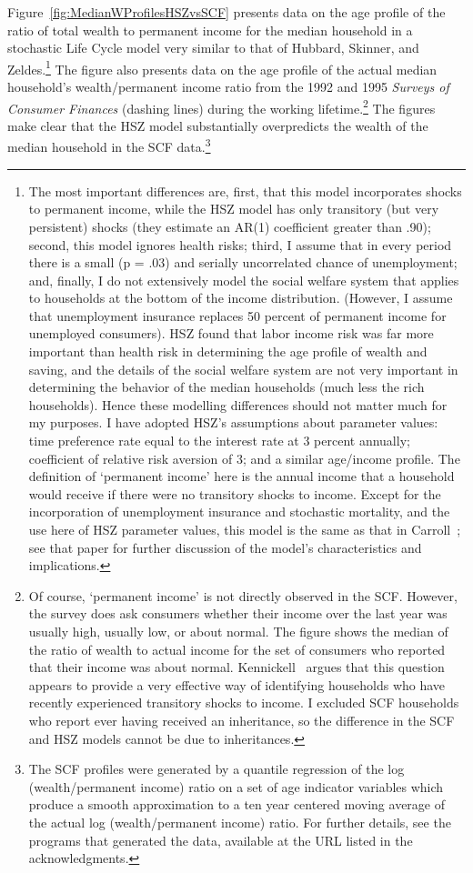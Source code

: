 \documentclass[titlepage,12pt]{article}
\begin{document}
Figure~\ref{fig:MedianWProfilesHSZvsSCF} presents data on the age 
profile of the ratio of total wealth to permanent income for the 
median household in a stochastic Life Cycle model very similar to that 
of Hubbard, Skinner, and Zeldes.\footnote{The most important 
differences are, first, that this model incorporates shocks to 
permanent income, while the HSZ model has only transitory (but very 
persistent) shocks (they estimate an AR(1) coefficient greater than 
.90); second, this model ignores health risks; third, I assume that in 
every period there is a small (p = .03) and serially uncorrelated 
chance of unemployment; and, finally, I do not extensively model the 
social welfare system that applies to households at the bottom of the 
income distribution.  (However, I assume that unemployment insurance 
replaces 50 percent of permanent income for unemployed consumers).  
HSZ found that labor income risk was far more important than health 
risk in determining the age profile of wealth and saving, and the 
details of the social welfare system are not very important in 
determining the behavior of the median households (much less the rich 
households).  Hence these modelling differences should not matter much 
for my purposes.  I have adopted HSZ's assumptions about parameter 
values: time preference rate equal to the interest rate at 3 percent 
annually; coefficient of relative risk aversion of 3; and a similar 
age/income profile.  The definition of `permanent income' here is the 
annual income that a household would receive if there were no 
transitory shocks to income.  Except for the incorporation of 
unemployment insurance and stochastic mortality, and the use here of 
HSZ parameter values, this model is the same as that in 
Carroll~\cite{carrollBSLCPIH}; see that paper for further discussion 
of the model's characteristics and implications.} The figure also 
presents data on the age profile of the actual median household's 
wealth/permanent income ratio from the 1992 and 1995 {\it Surveys of 
Consumer Finances} (dashing lines) during the working 
lifetime.\footnote{Of course, `permanent income' is not directly 
observed in the SCF. However, the survey does ask consumers whether 
their income over the last year was usually high, usually low, or 
about normal.  The figure shows the median of the ratio of wealth to 
actual income for the set of consumers who reported that their income 
was about normal.  Kennickell~\cite{kennickellPermanent} argues that 
this question appears to provide a very effective way of identifying 
households who have recently experienced transitory shocks to income.  
I excluded SCF households who report ever having received an 
inheritance, so the difference in the SCF and HSZ models cannot be due 
to inheritances.} The figures make clear that the HSZ model 
substantially overpredicts the wealth of the median household in the 
SCF data.\footnote{The SCF profiles were generated by a quantile 
regression of the log (wealth/permanent income) ratio on a set of age 
indicator variables which produce a smooth approximation to a ten year 
centered moving average of the actual log (wealth/permanent income) 
ratio.  For further details, see the programs that generated the data, 
available at the URL listed in the acknowledgments.}
\end{document}
